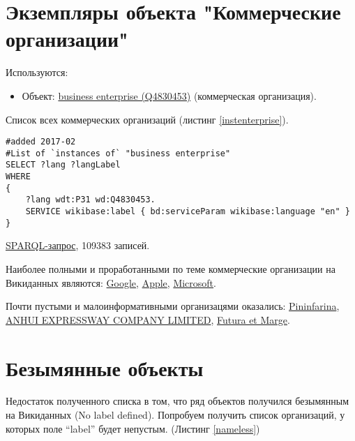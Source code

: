 \section*{Экземпляры объекта "Коммерческие организации"}

Используются:

\begin{itemize}
    \item Объект: \href{https://www.wikidata.org/wiki/Q4830453}{business enterprise (Q4830453)} (коммерческая организация).
\end{itemize}

Список всех коммерческих организаций (листинг \ref{instenterprise}).

\begin{lstlisting}[language=SPARQL,label=instenterprise,caption=Список всех коммерческих организаций]
#added 2017-02
#List of `instances of` "business enterprise" 
SELECT ?lang ?langLabel
WHERE
{
    ?lang wdt:P31 wd:Q4830453.
    SERVICE wikibase:label { bd:serviceParam wikibase:language "en" }
}
\end{lstlisting}

\href{https://query.wikidata.org/#%23List%20of%20%60instances%20of%60%20%22business%20enterprise%22%20%0ASELECT%20%3Flang%20%3FlangLabel%0AWHERE%0A%7B%0A%20%20%20%20%3Flang%20wdt%3AP31%20wd%3AQ4830453.%0A%20%20%20%20SERVICE%20wikibase%3Alabel%20%7B%20bd%3AserviceParam%20wikibase%3Alanguage%20%22en%22%20%7D%0A%7D}{SPARQL-запрос}, 109383 записей.

Наиболее полными и проработанными по теме коммерческие организации на Викиданных являются:
\href{https://www.wikidata.org/wiki/Q95}{Google}, 
\href{https://www.wikidata.org/wiki/Q312}{Apple},
\href{https://www.wikidata.org/wiki/Q2283}{Microsoft}.

Почти пустыми и малоинформативными организацями оказались:
\href{https://www.wikidata.org/wiki/Q40987}{Pininfarina},
\href{https://www.wikidata.org/wiki/Q46065}{ANHUI EXPRESSWAY COMPANY LIMITED},
\href{https://www.wikidata.org/wiki/Q45812}{Futura et Marge}.

\section*{Безымянные объекты}

Недостаток полученного списка в том, что ряд объектов получился безымянным на Викиданных (No label defined). Попробуем получить список организаций, у которых поле \enquote{label}     будет непустым. (Листинг \ref{nameless})

